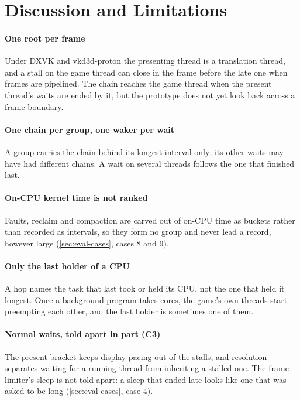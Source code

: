 \section{Discussion and Limitations}
\label{sec:limitations}

\paragraph{One root per frame} Under DXVK and vkd3d-proton the presenting thread
is a translation thread, and a stall on the game thread can close in the
frame before the late one when frames are pipelined. The chain reaches the
game thread when the present thread's waits are ended by it, but the
prototype does not yet look back across a frame boundary.

\paragraph{One chain per group, one waker per wait} A group carries the chain
behind its longest interval only; its other waits may have had different
chains. A wait on several threads follows the one that finished last.

\paragraph{On-CPU kernel time is not ranked} Faults, reclaim and compaction are
carved out of on-CPU time as buckets rather than recorded as intervals, so
they form no group and never lead a record, however large
(\autoref{sec:eval-cases}, cases 8 and 9).

\paragraph{Only the last holder of a CPU} A hop names the task that last took
or held its CPU, not the one that held it longest. Once a background
program takes cores, the game's own threads start preempting each other,
and the last holder is sometimes one of them.

\paragraph{Normal waits, told apart in part (C3)} The present bracket keeps
display pacing out of the stalls, and resolution separates waiting for a
running thread from inheriting a stalled one. The frame limiter's sleep is
not told apart: a sleep that ended late looks like one that was asked to be
long (\autoref{sec:eval-cases}, case 4).

